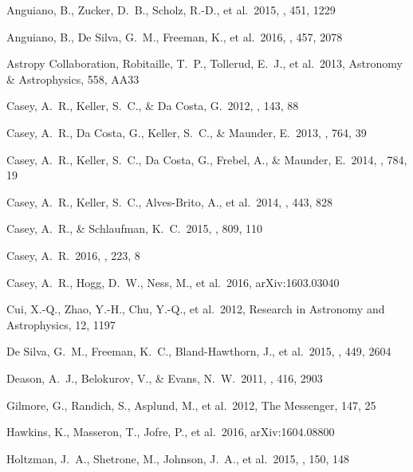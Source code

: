 \documentclass[preprint,trackchanges]{aastex}
\begin{document}
\begin{thebibliography}{dummy}
 Anguiano, B., Zucker, D.~B., Scholz, R.-D., et al.\ 2015, \mnras, 451, 1229 

 Anguiano, B., De Silva, G.~M., Freeman, K., et al.\ 2016, \mnras, 457, 2078 

 Astropy Collaboration, Robitaille, T.~P., Tollerud, E.~J., et al.\ 2013, Astronomy \& Astrophysics, 558, AA33

 Casey, A.~R., Keller, S.~C., \& Da Costa, G.\ 2012, \aj, 143, 88 

 Casey, A.~R., Da Costa, G., Keller, S.~C., \& Maunder, E.\ 2013, \apj, 764, 39 

 Casey, A.~R., Keller, S.~C., Da Costa, G., Frebel, A., \& Maunder, E.\ 2014, \apj, 784, 19 

 Casey, A.~R., Keller, S.~C., Alves-Brito, A., et al.\ 2014, \mnras, 443, 828 

 Casey, A.~R., \& Schlaufman, K.~C.\ 2015, \apj, 809, 110 

 Casey, A.~R.\ 2016, \apjs, 223, 8 

 Casey, A.~R., Hogg, D.~W., Ness, M., et al.\ 2016, arXiv:1603.03040 

 Cui, X.-Q., Zhao, Y.-H., Chu, Y.-Q., et al.\ 2012, Research in Astronomy and Astrophysics, 12, 1197 

 De Silva, G.~M., Freeman, K.~C., Bland-Hawthorn, J., et al.\ 2015, \mnras, 449, 2604 

 Deason, A.~J., Belokurov, V., \& Evans, N.~W.\ 2011, \mnras, 416, 2903 

 Gilmore, G., Randich, S., Asplund, M., et al.\ 2012, The Messenger, 147, 25

 Hawkins, K., Masseron, T., Jofre, P., et al.\ 2016, arXiv:1604.08800 

 Holtzman, J.~A., Shetrone, M., Johnson, J.~A., et al.\ 2015, \aj, 150, 148 


\end{thebibliography}
\end{document}

